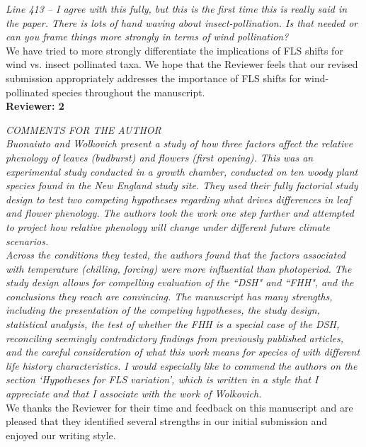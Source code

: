 \documentclass[11pt]{article}
\begin{document}
\emph{Line 413 – I agree with this fully, but this is the first time this is really said in the paper. There is lots of hand waving about insect-pollination. Is that needed or can you frame things more strongly in terms of wind pollination?}\\

\noindent We have tried to more strongly differentiate the implications of FLS shifts for wind vs. insect pollinated taxa. We hope that the Reviewer feels that our revised submission appropriately addresses the importance of FLS shifts for wind-pollinated species throughout the manuscript.\\

\textbf{Reviewer: 2}

\emph{COMMENTS FOR THE AUTHOR}\\
\emph{Buonaiuto and Wolkovich present a study of how three factors affect the relative phenology of leaves (budburst) and flowers (first opening).  This was an experimental study conducted in a growth chamber, conducted on ten woody plant species found in the New England study site. They used their fully factorial study design to test two competing hypotheses regarding what drives differences in leaf and flower phenology. The authors took the work one step further and attempted to project how relative phenology will change under different future climate scenarios.}\\

\emph{Across the conditions they tested, the authors found that the factors associated with temperature (chilling, forcing) were more influential than photoperiod. The study design allows for compelling evaluation of the ``DSH" and ``FHH", and the conclusions they reach are convincing. The manuscript has many strengths, including the presentation of the competing hypotheses, the study design, statistical analysis, the test of whether the FHH is a special case of the DSH, reconciling seemingly contradictory findings from previously published articles, and the careful consideration of what this work means for species of with different life history characteristics. I would especially like to commend the authors on the section `Hypotheses for FLS variation', which is written in a style that I appreciate and that I associate with the work of Wolkovich.}\\

\noindent We thanks the Reviewer for their time and feedback on this manuscript and are pleased that they identified several strengths in our initial submission and enjoyed our writing style.\\
\end{document}
